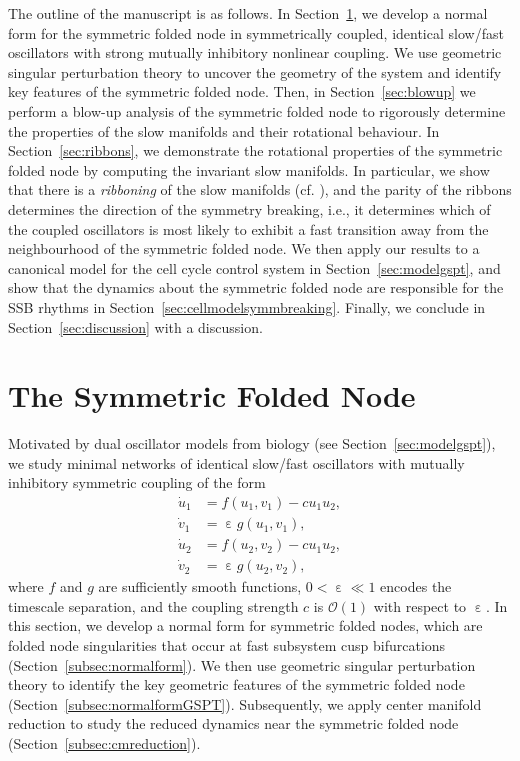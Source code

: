 \documentclass[10pt,onecolumn]{article}
\theoremstyle{plain}
\DeclareMathOperator{\eps}{\varepsilon}
\begin{document}
The outline of the manuscript is as follows. 
In Section~\ref{sec:normalform}, we develop a normal form for the symmetric folded node in symmetrically coupled, identical slow/fast oscillators with strong mutually inhibitory nonlinear coupling. We use geometric singular perturbation theory to uncover the geometry of the system and identify key features of the symmetric folded node. 
Then, in Section~\ref{sec:blowup} we perform a blow-up analysis of the symmetric folded node to rigorously determine the properties of the slow manifolds and their rotational behaviour.  
In Section~\ref{sec:ribbons}, we demonstrate the rotational properties of the symmetric folded node by computing the invariant slow manifolds. In particular, we show that there is a {\em ribboning} of the slow manifolds (cf. \cite{Hasan2017,Hasan2018}), and the parity of the ribbons determines the direction of the symmetry breaking, i.e., it determines which of the coupled oscillators is most likely to exhibit a fast transition away from the neighbourhood of the symmetric folded node. 
We then apply our results to a canonical model for the cell cycle control system in Section~\ref{sec:modelgspt}, and show that the dynamics about the symmetric folded node are responsible for the SSB rhythms in Section~\ref{sec:cellmodelsymmbreaking}.  
Finally, we conclude in Section~\ref{sec:discussion} with a discussion.

\section{The Symmetric Folded Node} \label{sec:normalform}
Motivated by dual oscillator models from biology (see Section~\ref{sec:modelgspt}), we study minimal networks of identical slow/fast oscillators with mutually inhibitory symmetric coupling of the form
%
\begin{equation} \label{eq:coupled_general}
  \begin{split}
    \dot u_1 &= f(u_1,v_1) - c u_1 u_2, \\ 
    \dot v_1 &= \eps g(u_1,v_1), \\ 
    \dot u_2 &= f(u_2,v_2) - c u_1 u_2, \\ 
    \dot v_2 &= \eps g(u_2,v_2),
  \end{split}
\end{equation}
%
where $f$ and $g$ are sufficiently smooth functions, $0<\eps \ll 1$ encodes the timescale separation, and the coupling strength $c$ is $\mathcal{O}(1)$ with respect to $\eps$. 
In this section, we develop a normal form for symmetric folded nodes, which are folded node singularities that occur at fast subsystem cusp bifurcations (Section~\ref{subsec:normalform}).  
We then use geometric singular perturbation theory \cite{Fenichel1979,Jones1995} to identify the key geometric features of the symmetric folded node (Section~\ref{subsec:normalformGSPT}). 
Subsequently, we apply center manifold reduction to study the reduced dynamics near the symmetric folded node (Section~\ref{subsec:cmreduction}). 
\end{document}
